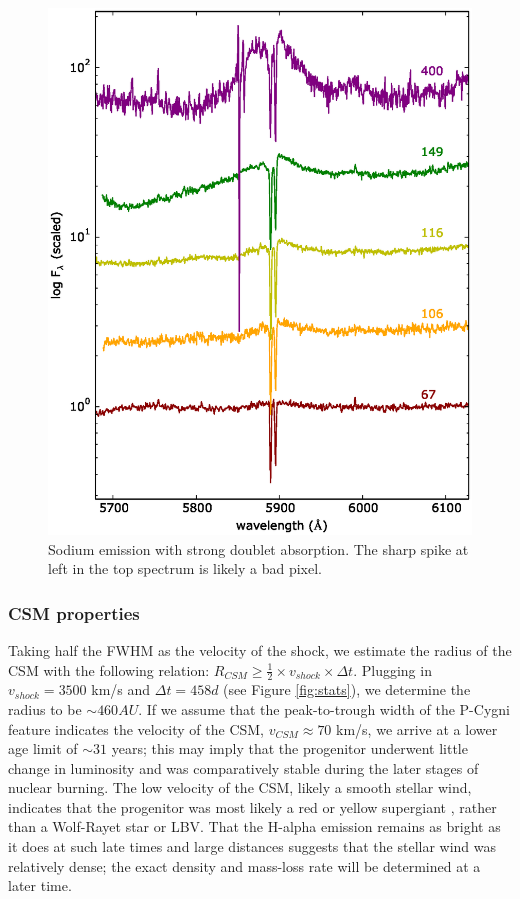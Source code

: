 \documentclass[iop]{emulateapj}
\begin{document}
\begin{figure}
  \includegraphics[width=\linewidth]{graphics/sodium.eps}
  \caption{Sodium emission with strong doublet absorption. The sharp spike at left in the top spectrum is likely a bad pixel.}
  \label{fig:sodium}
\end{figure}

\subsubsection{CSM properties} \label{analysis:spec:csm}
Taking half the FWHM as the velocity of the shock, we estimate the radius of the CSM with the following relation: $R_{CSM} \ge \frac{1}{2} \times v_{shock} \times \Delta t$. Plugging in $v_{shock} = 3500$ km/s and $\Delta t = 458 d$ (see Figure \ref{fig:stats}), we determine the radius to be $\sim460 AU$. If we assume that the peak-to-trough width of the P-Cygni feature indicates the velocity of the CSM, $v_{CSM} \approx 70$ km/s, we arrive at a lower age limit of $\sim31$ years; this may imply that the progenitor underwent little change in luminosity and was comparatively stable during the later stages of nuclear burning. The low velocity of the CSM, likely a smooth stellar wind, indicates that the progenitor was most likely a red or yellow supergiant \citep{Smi15}, rather than a Wolf-Rayet star or LBV. That the H-alpha emission remains as bright as it does at such late times and large distances suggests that the stellar wind was relatively dense; the exact density and mass-loss rate will be determined at a later time.
\end{document}
